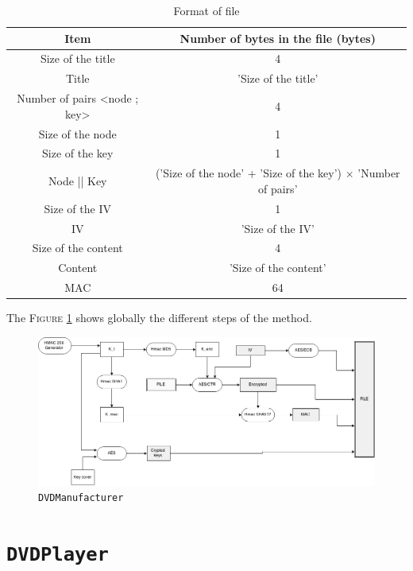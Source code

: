\documentclass[a4paper,titlepage]{article}
\begin{document}
\renewcommand{\arraystretch}{1.6}
\begin{table}[h]
	\center
	\begin{tabular}{|c|c|}
		\hline
		\textbf{Item} & \textbf{Number of bytes in the file (bytes)}\\
		\hline
		Size of the title & 4\\
		\hline
		Title & 'Size of the title'\\
		\hline
		Number of pairs <node ; key> & 4\\
		\hline
		Size of the node & 1\\
		\hline
		Size of the key & 1\\
		\hline
		Node || Key & ('Size of the node' + 'Size of the key') $\times$ 'Number of pairs'\\
		\hline
		Size of the IV & 1\\
		\hline
		IV & 'Size of the IV'\\
		\hline
		Size of the content & 4\\
		\hline
		Content & 'Size of the content'\\
		\hline
		MAC & 64\\ 
		\hline
	\end{tabular}
	\caption{Format of file}
	\label{format}
\end{table}

The \textsc{Figure} \ref{DVDManufacturer} shows globally the different steps of the method.
\begin{figure}
	\centering
	\includegraphics[scale=0.43]{DVDManufacturer.png}
	\caption{\texttt{DVDManufacturer}}
	\label{DVDManufacturer}
\end{figure}


\section{\texttt{DVDPlayer}}
\end{document}
